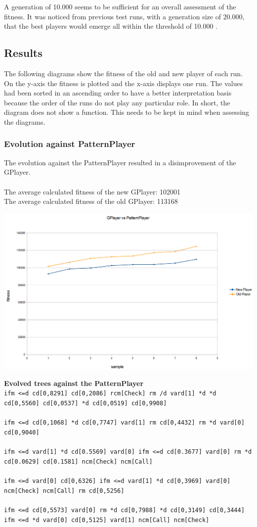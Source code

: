 \documentclass[12pt,fleqn,a4paper]{article}
\begin{document}
A generation of 10.000 seems to be sufficient for an overall assessment of the fitness. It was noticed from previous test runs, with a generation size of 20.000, that the best players would emerge all within the threshold of 10.000 .

\subsection{Results}
The following diagrams show the fitness of the old and new player of each run. \\
On the y-axis the fitness is plotted and the x-axis displays one run. The values had been sorted in an ascending order to have a better interpretation basis because the order of the runs do not play any particular role. In short, the diagram does not show a function. This needs to be kept in mind when assessing the diagrams.
\subsubsection{Evolution against PatternPlayer}
The evolution against the PatternPlayer resulted in a disimprovement of the GPlayer.  \\ \\
The average calculated fitness of the new GPlayer: 102001\\
The average calculated fitness of the old GPlayer: 113168
\begin{center}
	\includegraphics[width=.9\textwidth]{gp_vs_pp_1.png}
\end{center}
\textbf{Evolved trees against the PatternPlayer}\\ 
\texttt{ifm <=d cd[0,8291] cd[0,2086] rcm[Check] rm /d vard[1] *d *d cd[0,5560] cd[0,0537] *d cd[0,0519] cd[0,9908]} \\ \\
\texttt{ifm <=d cd[0,1068] *d cd[0,7747] vard[1] rm cd[0,4432] rm *d vard[0] cd[0,9040]}\\ \\
\texttt{ifm <=d vard[1] *d cd[0.5569] vard[0] ifm <=d cd[0.3677] vard[0] rm *d cd[0.0629] cd[0.1581] ncm[Check] ncm[Call]}\\ \\
\texttt{ifm <=d vard[0] cd[0,6326] ifm <=d vard[1] *d cd[0,3969] vard[0] ncm[Check] ncm[Call] rm cd[0,5256]}\\ \\
\texttt{ifm <=d cd[0,5573] vard[0] rm *d cd[0,7988] *d cd[0,3149] cd[0,3444] ifm <=d *d vard[0] cd[0,5125] vard[1] ncm[Call] ncm[Check]}
\end{document}
